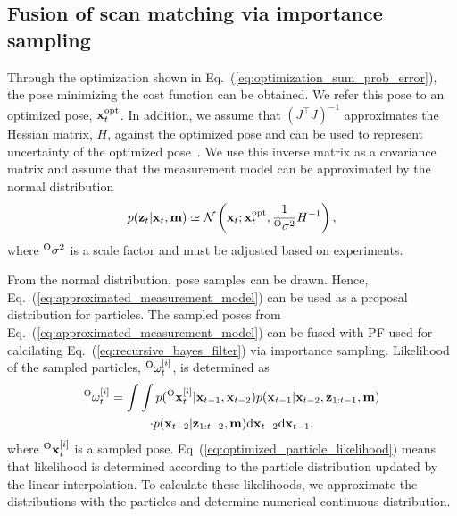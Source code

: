 \documentclass[letterpaper, 10 pt, conference]{ieeeconf}  %
\begin{document}
\subsection{Fusion of scan matching via importance sampling}
\label{subsec:fusion_of_sm_and_pf}

Through the optimization shown in Eq.~(\ref{eq:optimization_sum_prob_error}), the pose minimizing the cost function can be obtained.
We refer this pose to an optimized pose, ${\bf x}_{t}^{\rm opt}$.
In addition, we assume that $\left( J^{\top} J \right)^{-1}$ approximates the Hessian matrix, $H$, against the optimized pose and can be used to represent uncertainty of the optimized pose~\cite{BengtssonIROS2001}.
We use this inverse matrix as a covariance matrix and assume that the measurement model can be approximated by the normal distribution
%
\begin{align}
    p({\bf z}_{t} | {\bf x}_{t}, {\bf m}) \simeq \mathcal{N} \left( {\bf x}_{t}; {\bf x}_{t}^{\rm opt}, \frac{1}{{}^{\rm O}\sigma^{2}}H^{-1} \right),
    \label{eq:approximated_measurement_model}
\end{align}
%
where ${}^{\rm O}\sigma^{2}$ is a scale factor and must be adjusted based on experiments.

From the normal distribution, pose samples can be drawn.
Hence, Eq.~(\ref{eq:approximated_measurement_model}) can be used as a proposal distribution for particles.
The sampled poses from Eq.~(\ref{eq:approximated_measurement_model}) can be fused with PF used for calcilating Eq.~(\ref{eq:recursive_bayes_filter}) via importance sampling.
Likelihood of the sampled particles, ${}^{\rm O}\omega_{t}^{[i]}$, is determined as
%
\begin{align}
    \begin{gathered}
        {}^{\rm O}\omega_{t}^{[i]} = \int \int p({}^{\rm O}{\bf x}_{t}^{[i]} | {\bf x}_{t-1}, {\bf x}_{t-2}) p({\bf x}_{t-1} | {\bf x}_{t-2}, {\bf z}_{1:t-1}, {\bf m}) \\
        \cdot p({\bf x}_{t-2} | {\bf z}_{1:t-2}, {\bf m}) {\rm d}{\bf x}_{t-2} {\rm d}{\bf x}_{t-1},
        \label{eq:optimized_particle_likelihood}
    \end{gathered}
\end{align}
%
where ${}^{\rm O}{\bf x}_{t}^{[i]}$ is a sampled pose.
Eq~(\ref{eq:optimized_particle_likelihood}) means that likelihood is determined according to the particle distribution updated by the linear interpolation.
To calculate these likelihoods, we approximate the distributions with the particles and determine numerical continuous distribution.
\end{document}

